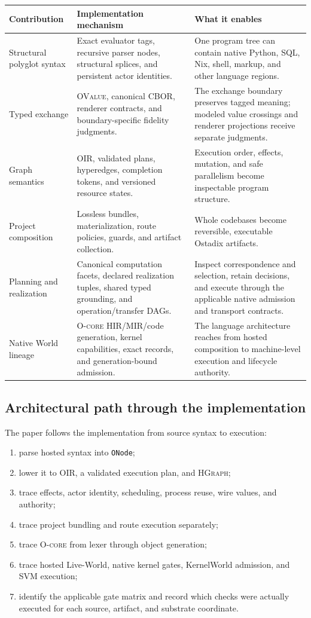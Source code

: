 \documentclass[11pt,oneside]{article}
\newcommand{\ovalue}{{\mdseries\textsc{OValue}}}
\newcommand{\oir}{{\mdseries\textsc{OIR}}}
\newcommand{\hgraph}{{\mdseries\textsc{HGraph}}}
\newcommand{\ocore}{{\mdseries\textsc{O-core}}}
\begin{document}
\begin{longtable}{P{0.20\textwidth} P{0.36\textwidth} P{0.36\textwidth}}
\toprule
\textbf{Contribution} & \textbf{Implementation mechanism} & \textbf{What it enables} \\
\midrule
\endhead
Structural polyglot syntax &
Exact evaluator tags, recursive parser nodes, structural splices, and
persistent actor identities. &
One program tree can contain native Python, SQL, Nix, shell, markup, and other
language regions. \\
Typed exchange &
\ovalue{}, canonical CBOR, renderer contracts, and boundary-specific fidelity
judgments. &
The exchange boundary preserves tagged meaning; modeled value crossings and
renderer projections receive separate judgments. \\
Graph semantics &
\oir{}, validated plans, hyperedges, completion tokens, and versioned resource
states. &
Execution order, effects, mutation, and safe parallelism become inspectable
program structure. \\
Project composition &
Lossless bundles, materialization, route policies, guards, and artifact
collection. &
Whole codebases become reversible, executable Ostadix artifacts. \\
Planning and realization &
Canonical computation facets, declared realization tuples, shared typed
grounding, and operation/transfer DAGs. &
Inspect correspondence and selection, retain decisions, and execute through
the applicable native admission and transport contracts. \\
Native World lineage &
\ocore{} HIR/MIR/code generation, kernel capabilities, exact records, and
generation-bound admission. &
The language architecture reaches from hosted composition to machine-level
execution and lifecycle authority. \\
\bottomrule
\end{longtable}

\subsection{Architectural path through the implementation}

The paper follows the implementation from source syntax to execution:

\begin{enumerate}
  \item parse hosted syntax into \texttt{ONode};
  \item lower it to \oir{}, a validated execution plan, and \hgraph{};
  \item trace effects, actor identity, scheduling, process reuse, wire values,
        and authority;
  \item trace project bundling and route execution separately;
  \item trace \ocore{} from lexer through object generation;
  \item trace hosted Live-World, native kernel gates, KernelWorld admission,
        and SVM execution;
  \item identify the applicable gate matrix and record which checks were
        actually executed for each source, artifact, and substrate coordinate.
\end{enumerate}
\end{document}
